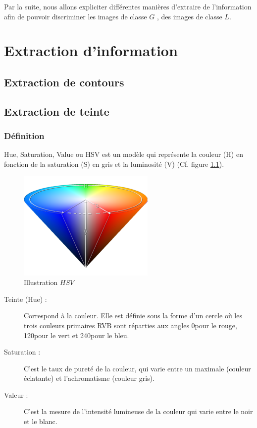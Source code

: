 \documentclass{book}
\begin{document}
Par la suite, nous allons expliciter différentes manières d'extraire de l'information afin de pouvoir discriminer les images de classe $G$
, des images de classe $L$.

\chapter{Extraction d'information}
\section{Extraction de contours}
\section{Extraction de teinte}
\subsection{Définition}
Hue, Saturation, Value ou HSV est un modèle qui représente la couleur (H) en fonction de la saturation (S) en gris et la luminosité (V) (Cf. figure \ref{HSV}).
\begin{figure}[H]
\begin{center}
\includegraphics[scale=0.5]{hue.jpg}
\end{center}
\caption{Illustration $HSV$ \cite{wiki:hsv}}
\label{HSV}
\end{figure}
\begin{description}
\item[Teinte (Hue) :] Correspond à la couleur. Elle est définie sous la forme
d'un cercle où les trois couleurs primaires RVB sont
réparties aux angles 0\degre pour le rouge, 120\degre pour le vert
et 240\degre pour le bleu.
\item[Saturation :] C’est le taux de pureté de la couleur, qui varie entre un
maximale (couleur éclatante) et l’achromatisme (couleur
gris).
\item[Valeur :]  C’est la mesure de l’intensité lumineuse de la couleur
qui varie entre le noir et le blanc.
\end{description}
\end{document}
